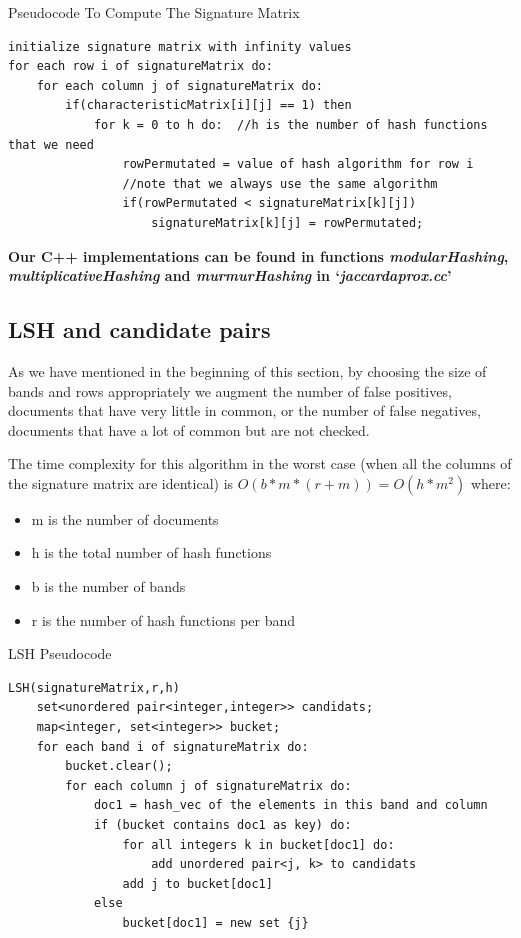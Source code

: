 \documentclass[12pt]{article}
\begin{document}
{ \begin{center}
\begin{large}
Pseudocode To Compute The Signature Matrix
\end{large}
\end{center}
\begin{lstlisting}
initialize signature matrix with infinity values
for each row i of signatureMatrix do:
	for each column j of signatureMatrix do:
		if(characteristicMatrix[i][j] == 1) then
			for k = 0 to h do:	//h is the number of hash functions that we need
				rowPermutated = value of hash algorithm for row i
				//note that we always use the same algorithm
				if(rowPermutated < signatureMatrix[k][j])
					signatureMatrix[k][j] = rowPermutated;
\end{lstlisting}

\bigskip
\textbf{Our C++ implementations can be found in functions \textit{\mbox{modularHashing}}, \textit{\mbox{multiplicativeHashing}} and \textit{\mbox{murmurHashing}} in `\textit{\mbox{jaccardaprox.cc}}'}

\subsection{LSH and candidate pairs}
As we have mentioned in the beginning of this section, by choosing the size of bands and rows appropriately we augment the number of false positives, documents that have very little in common, or the number of false negatives, documents that have a lot of common but are not checked. 

\bigskip
The time complexity for this algorithm in the worst case (when all the columns of the signature matrix are identical) is $O(b*m*(r+m)) = O(h*m^2)$ where: 
\begin{itemize}
\item m is the number of documents
\item h is the total number of hash functions
\item b is the number of bands
\item r is the number of hash functions per band
\end{itemize}
 \begin{center}
\begin{large}
LSH Pseudocode
\end{large}
\end{center}

\begin{lstlisting}
LSH(signatureMatrix,r,h)
    set<unordered pair<integer,integer>> candidats;                     
    map<integer, set<integer>> bucket;
    for each band i of signatureMatrix do:
        bucket.clear();
        for each column j of signatureMatrix do:
            doc1 = hash_vec of the elements in this band and column
            if (bucket contains doc1 as key) do:
            	for all integers k in bucket[doc1] do:
            		add unordered pair<j, k> to candidats
            	add j to bucket[doc1]
            else
            	bucket[doc1] = new set {j}
            	

\end{lstlisting}}
\end{document}
